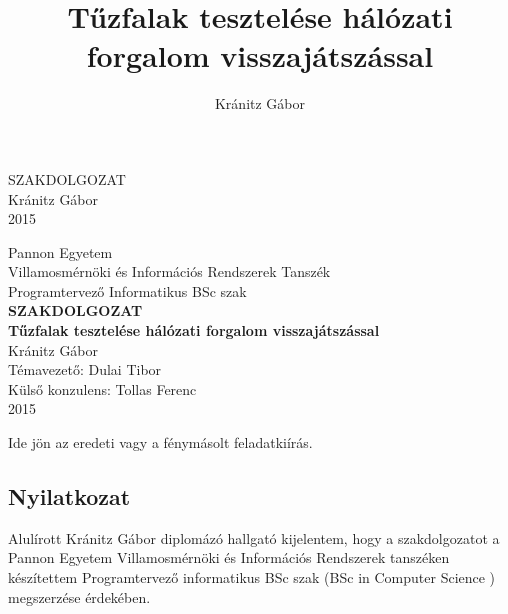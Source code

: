 \documentclass[a4paper,12pt,oneside]{report}
\title{Tűzfalak tesztelése hálózati forgalom visszajátszással}
\author{Kránitz Gábor}
\date{}
\begin{document}

\setcounter{chapter}{1}

\pagestyle{empty}
{
    \begin{center}
    \vspace*{5cm}
    {
        \Huge SZAKDOLGOZAT}\\
        \vspace*{10cm}
        {\LARGE Kránitz Gábor}\\
        \vspace*{3cm}
        {\LARGE 2015}
    \end{center}
}
\newpage

\begin{center}
{
    \Large Pannon Egyetem\\
    Villamosmérnöki és Információs Rendszerek Tanszék\vspace*{3mm}\\
    Programtervező Informatikus BSc szak
}
    \vspace*{2cm}\\
    {\LARGE \bf SZAKDOLGOZAT}
    \vspace{3cm}\\
    {\LARGE\bf Tűzfalak tesztelése hálózati forgalom visszajátszással }
    \vspace{3cm}\\
    {\large Kránitz Gábor}
    \vspace{6cm}
    \\
    {\large Témavezető: Dulai Tibor}\\
    {\large Külső konzulens: Tollas Ferenc}
    \vspace{1cm}\\
    {\large 2015}
\end{center}
\normalsize
\newpage

Ide jön az eredeti vagy a fénymásolt feladatkiírás.
\newpage
 
\begin{center}
\section*{Nyilatkozat}
\end{center}
 
Alulírott Kránitz Gábor diplomázó hallgató kijelentem, hogy a szakdolgozatot a Pannon Egyetem Villamosmérnöki és Információs Rendszerek tanszéken készítettem Programtervező informatikus BSc szak (BSc in Computer Science
) megszerzése érdekében.
\end{document}

